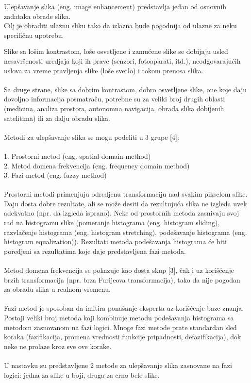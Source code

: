 \documentclass[12pt,a4paper]{article}
\theoremstyle{definition}
\theoremstyle{remark}
\theoremstyle{plain}
\begin{document}
Ulep\v savanje slika (eng. image enhancement) predstavlja jedan od osnovnih zadataka obrade slika. \\
Cilj je obraditi ulaznu sliku tako da izlazna bude pogodnija od ulazne za neku specifi\v cnu upotrebu. 

Slike sa lo\v sim kontrastom, lo\v se osvetljene i zamu\' cene slike se dobijaju usled nesavr\v senosti uredjaja koji ih prave (senzori, fotoaparati, itd.), neodgovaraju\' cih uslova za vreme pravljenja slike (lo\v se svetlo) i tokom prenosa slika.
\\ \\
Sa druge strane, slike sa dobrim kontrastom, dobro osvetljene slike, one koje daju dovoljno informacija posmatra\v cu, potrebne su za veliki broj drugih oblasti (medicina, analiza prostora, autonomna navigacija, obrada slika dobijenih satelitima) ili za dalju obradu slika.
\\ \\
Metodi za ulep\v savanje slika se mogu podeliti u 3 grupe [4]:
\\
\\1. Prostorni metod (eng. spatial domain method)
\\2. Metod domena frekvencija (eng. frequency domain method)
\\3. Fazi metod (eng. fuzzy method)
\\ \\ 
Prostorni metodi primenjuju odredjenu transformaciju nad svakim pikselom slike. Daju dosta dobre rezultate, ali se mo\v ze desiti da rezultuju\' ca slika ne izgleda uvek adekvatno (npr. da izgleda isprano).
Neke od prostornih metoda zasnivaju svoj rad na histogramu slike (pomeranje histograma (eng. histogram sliding), razvla\v cenje histograma (eng. histogram stretching), pode\v savanje histograma (eng. histogram equalization)).
Rezultati metoda pode\v savanja histograma \' ce biti poredjeni sa rezultatima koje daje predstavljena fazi metoda.
\\ \\ 
Metod domena frekvencija se pokazuje kao dosta skup [3], \v cak i uz kori\v s\' cenje brzih transformacija (npr. brza Furijeova transformacija), tako da nije pogodan za obradu slika u realnom vremenu.
\\ \\ 
Fazi metod je sposoban da imitira pona\v sanje eksperta uz kori\v s\' cenje baze znanja.\\
Postoji veliki broj metoda koji kombinuje metodu pode\v savanja histograma sa metodom zasnovanom na fazi logici.
Mnoge fazi metode prate standardan sled koraka (fazifikacija, promena vrednosti funkcije pripadnosti, defazifikacija), dok neke ne prolaze kroz sve ove korake.
\\
\\
U nastavku su predstavljene 2 metode za ulep\v savanje slika zasnovane na fazi logici: jedna za slike u boji, druga za crno-bele slike.
\end{document}
